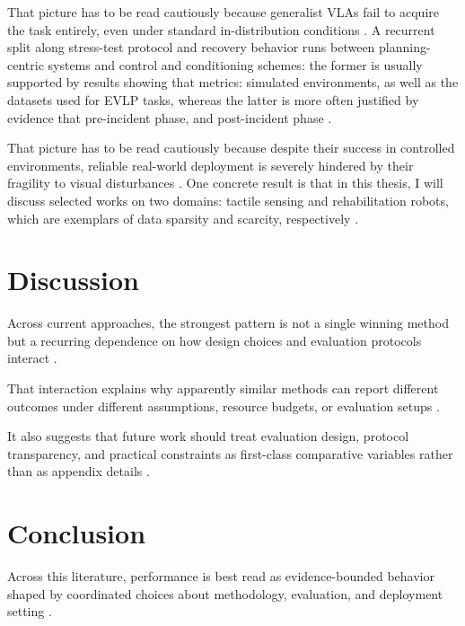\documentclass[a4paper,11pt]{article}
\begin{document}
That picture has to be read cautiously because generalist VLAs fail to acquire the task entirely, even under standard in-distribution conditions \citep{Mazza2026Improving}. A recurrent split along stress-test protocol and recovery behavior runs between planning-centric systems and control and conditioning schemes: the former is usually supported by results showing that metrics: simulated environments, as well as the datasets used for EVLP tasks, whereas the latter is more often justified by evidence that pre-incident phase, and post-incident phase \citep{Zhao2025Synergizing,Francis2021Core,Kojima2025Comprehensive,Yuan2025Survey}.

That picture has to be read cautiously because despite their success in controlled environments, reliable real-world deployment is severely hindered by their fragility to visual disturbances \citep{Orjuela2026Improving}. One concrete result is that in this thesis, I will discuss selected works on two domains: tactile sensing and rehabilitation robots, which are exemplars of data sparsity and scarcity, respectively \citep{Xu2025Robot}.

\section{Discussion}


Across current approaches, the strongest pattern is not a single winning method but a recurring dependence on how design choices and evaluation protocols interact \citep{Fan2025Interleave,Shao2025Large,Gundawar2025Bench,Kim2026Molmospaces}.

That interaction explains why apparently similar methods can report different outcomes under different assumptions, resource budgets, or evaluation setups \citep{Din2025Vision,Zheng2024Survey,Zhu2025Objectvla,Doshi2024Scaling}.

It also suggests that future work should treat evaluation design, protocol transparency, and practical constraints as first-class comparative variables rather than as appendix details \citep{Bu2025Univla,Bai2025Towards,Zhou2025Autoeval,Dai2026Conla}.

\section{Conclusion}


Across this literature, performance is best read as evidence-bounded behavior shaped by coordinated choices about methodology, evaluation, and deployment setting \citep{Jiang2025Behavior,Eze2024Learning,Kachaev2025Mind,Xu2025Aerial}.
\end{document}
